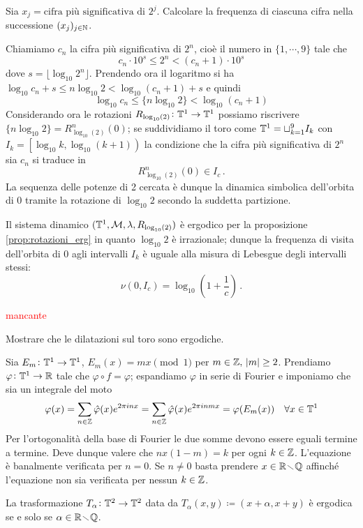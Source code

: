 \begin{exercise}\label{ex:potenze_di_due_cancro}
    Sia $ x_j = \text{cifra più significativa di } 2^j $. Calcolare la frequenza di ciascuna cifra nella successione $ (x_j)_{j\in\mathbb{N}} $.
\end{exercise}
\begin{solution}
    Chiamiamo $ c_n $ la cifra più significativa di $ 2^n $, cioè il numero in $ \{1, \cdots, 9\} $ tale che
    \[ c_n \cdot 10^s \leq 2^n < (c_n+1) \cdot 10^s \]
    dove $ s = \lfloor \log_{10} 2^n \rfloor $. Prendendo ora il logaritmo si ha $ \log_{10}c_n + s \leq n\log_{10}2 < \log_{10}(c_n+1) + s $ e quindi
    \[ \log_{10}c_n \leq \{n\log_{10}2\} < \log_{10}(c_n+1) \]
    Considerando ora le rotazioni $ R_{\log_{10}(2)} \colon \mathbb{T}^1\to\mathbb{T}^1 $ possiamo riscrivere $ \{ n\log_{10}2 \} = R^n_{\log_{10}(2)}(0) $;
    se suddividiamo il toro come $ \mathbb{T}^1 = \sqcup_{k=1}^9 I_k $ con $ I_k = \left[\log_{10}k,\log_{10}(k+1)\right) $ la condizione che la cifra più significativa di $ 2^n $ sia $ c_n $ si traduce in
    \[ R^n_{\log_{10}(2)}(0) \in I_c \, . \]
    La sequenza delle potenze di 2 cercata è dunque la dinamica simbolica dell'orbita di 0 tramite la rotazione di $ \log_{10}2 $ secondo la suddetta partizione.

    Il sistema dinamico $ (\mathbb{T}^1, \mathcal{M}, \lambda, R_{\log_{10}(2)}) $ è ergodico per la proposizione \ref{prop:rotazioni_erg} in quanto $ \log_{10}2 $ è irrazionale; dunque la frequenza di visita dell'orbita di 0 agli intervalli $ I_k $ è uguale alla misura di Lebesgue degli intervalli stessi:
    \[ \nu(0,I_c) = \log_{10}\left(1+\frac{1}{c}\right) \, . \]
\end{solution}

\begin{example}
    \textcolor{red}{mancante}
\end{example}

\begin{exercise}
    Mostrare che le dilatazioni sul toro sono ergodiche.
\end{exercise}
\begin{solution}
    Sia $ E_m\colon\mathbb{T}^1\to\mathbb{T}^1 $, $ E_m(x) = mx\pmod{1} $ per $ m\in\mathbb{Z},\ \abs{m} \geq 2 $. Prendiamo $ \varphi\colon\mathbb{T}^1\to\mathbb{R} $ tale che $ \varphi\circ f = \varphi $; espandiamo $ \varphi $ in serie di Fourier e imponiamo che sia un integrale del moto
    \[ \varphi(x) = \sum_{n\in\mathbb{Z}} \hat\varphi(x) e^{2\pi i n x} = \sum_{n\in\mathbb{Z}} \hat\varphi(x) e^{2\pi i n m x} = \varphi(E_m(x)) \quad \forall x\in\mathbb{T}^1 \]
    Per l'ortogonalità della base di Fourier le due somme devono essere eguali termine a termine. Deve dunque valere che $ nx(1-m) = k $ per ogni $ k\in\mathbb{Z} $. L'equazione è banalmente verificata per $ n = 0 $. Se $ n\neq 0 $ basta prendere $ x\in\mathbb{R}\!\smallsetminus\!\mathbb{Q} $ affinché l'equazione non sia verificata per nessun $ k\in\mathbb{Z} $.
\end{solution}

\begin{exercise}
    La trasformazione $ T_\alpha \colon \mathbb{T}^2 \to \mathbb{T}^2 $ data da $ T_\alpha(x, y) \coloneqq (x+\alpha, x+y) $ è ergodica se e solo se $ \alpha \in \mathbb{R} \!\smallsetminus\! \mathbb{Q} $.
\end{exercise}

